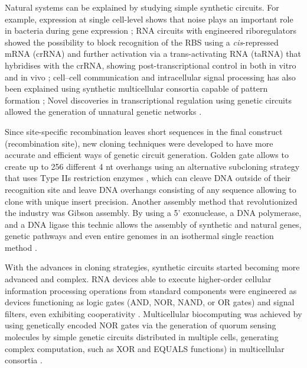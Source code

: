 Natural systems can be explained by studying simple synthetic circuits. For example, expression at single cell-level shows that noise plays an important role in bacteria during gene expression \citep{elowitz2002stochastic}; RNA circuits with engineered riboregulators showed the possibility to block recognition of the RBS using a \textit{cis}-repressed mRNA (crRNA) and further activation via a trans-activating RNA (taRNA) that hybridises with the crRNA, showing post-transcriptional control in both in vitro and in vivo \citep{isaacs2004engineered}; cell–cell communication and intracellular signal processing has also been explained  using synthetic multicellular consortia capable of pattern formation \citep{basu2005synthetic}; Novel discoveries in transcriptional regulation using genetic circuits allowed the generation of unnatural genetic networks \citep{alon2007network}.

Since site-specific recombination leaves short sequences in the final construct (recombination site), new cloning techniques were developed to have more accurate and efficient ways of genetic circuit generation.  Golden gate allows to create up to 256 different 4 nt overhangs using an alternative subcloning strategy that uses Type IIs restriction enzymes \citep{engler2008one}, which can cleave DNA outside of their recognition site and leave DNA overhangs consisting of any sequence allowing to clone with unique insert precision. Another assembly method that revolutionized the industry was Gibson assembly. By using a 5’ exonuclease, a DNA polymerase, and a DNA ligase this technic allows the assembly of synthetic and natural genes, genetic pathways and even entire genomes in an isothermal single reaction method \citep{gibson2009enzymatic}. 

With the advances in cloning strategies, synthetic circuits started becoming more advanced and complex. RNA devices able to execute higher-order cellular information processing operations from standard components were engineered as devices functioning as logic gates (AND, NOR, NAND, or OR gates) and signal filters, even exhibiting cooperativity \citep{win2008higher}. Multicellular biocomputing was achieved by using genetically encoded NOR gates via the generation of quorum sensing molecules by simple genetic circuits distributed in multiple cells, generating complex computation, such as XOR and EQUALS functions) in multicellular consortia \citep{tamsir2011robust}. 

